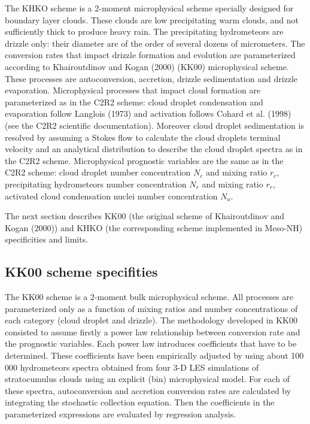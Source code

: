 The KHKO scheme is a 2-moment microphysical scheme specially designed for boundary layer clouds. These clouds are low precipitating warm clouds, and not sufficiently thick to produce heavy rain. The precipitating hydrometeors are drizzle only: their diameter are of the order of several dozens of micrometers. The conversion rates that impact drizzle formation and evolution are parameterized according to Khairoutdinov and Kogan (2000) (KK00) microphysical scheme. These processes are autoconversion, accretion, drizzle sedimentation and drizzle evaporation. Microphysical processes that impact cloud formation are parameterized as in the C2R2 scheme: cloud droplet condensation and evaporation follow Langlois (1973) and activation follows Cohard et al. (1998) (see the C2R2 scientific documentation). Moreover cloud droplet sedimentation is resolved by assuming a Stokes flow to calculate the cloud droplets terminal velocity and an analytical distribution to describe the cloud droplet spectra as in the C2R2 scheme.
Microphysical prognostic variables are the same as in the C2R2 scheme: cloud droplet number concentration $N_{c}$ and mixing ratio $r_{c}$, precipitating hydrometeors number concentration $N_{r}$ and mixing ratio $r_{r}$, activated cloud condensation nuclei number concentration $N_{a}$.


The next section describes KK00 (the original scheme of Khairoutdinov and Kogan (2000)) and  KHKO (the corresponding scheme implemented in Meso-NH) specificities and limits.

\subsection{KK00 scheme specifities}


The KK00 scheme is a 2-moment bulk microphysical scheme. All processes are parameterized only as a function of mixing ratios and number concentrations of each category (cloud droplet and drizzle). 
The methodology developed in KK00 consisted to assume firstly a power law relationship between conversion rate and the prognostic variables. Each power law introduces coefficients that have to be determined. These coefficients have been empirically adjusted by using about 100 000 hydrometeors spectra obtained from four 3-D LES simulations of stratocumulus clouds using an explicit (bin) microphysical model. For each of these spectra, autoconversion and accretion conversion rates are calculated by integrating the stochastic collection equation. Then the coefficients in the parameterized expressions are evaluated by regression analysis.


